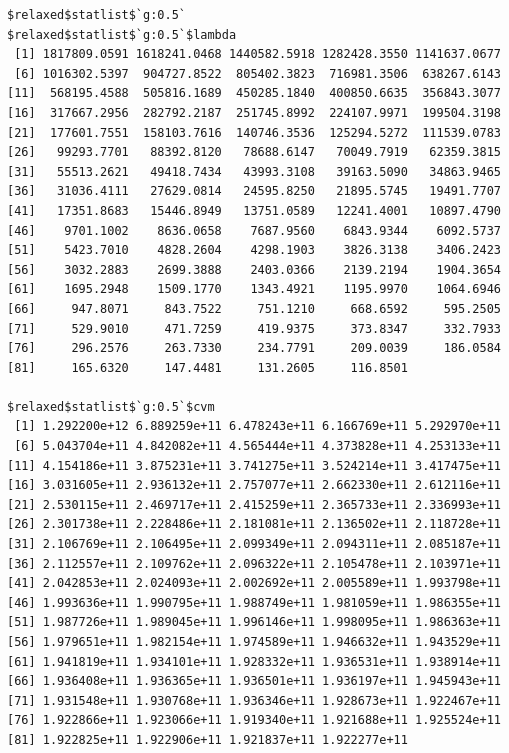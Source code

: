 \documentclass[
]{article}
\begin{document}
\begin{verbatim}
$relaxed$statlist$`g:0.5`
$relaxed$statlist$`g:0.5`$lambda
 [1] 1817809.0591 1618241.0468 1440582.5918 1282428.3550 1141637.0677
 [6] 1016302.5397  904727.8522  805402.3823  716981.3506  638267.6143
[11]  568195.4588  505816.1689  450285.1840  400850.6635  356843.3077
[16]  317667.2956  282792.2187  251745.8992  224107.9971  199504.3198
[21]  177601.7551  158103.7616  140746.3536  125294.5272  111539.0783
[26]   99293.7701   88392.8120   78688.6147   70049.7919   62359.3815
[31]   55513.2621   49418.7434   43993.3108   39163.5090   34863.9465
[36]   31036.4111   27629.0814   24595.8250   21895.5745   19491.7707
[41]   17351.8683   15446.8949   13751.0589   12241.4001   10897.4790
[46]    9701.1002    8636.0658    7687.9560    6843.9344    6092.5737
[51]    5423.7010    4828.2604    4298.1903    3826.3138    3406.2423
[56]    3032.2883    2699.3888    2403.0366    2139.2194    1904.3654
[61]    1695.2948    1509.1770    1343.4921    1195.9970    1064.6946
[66]     947.8071     843.7522     751.1210     668.6592     595.2505
[71]     529.9010     471.7259     419.9375     373.8347     332.7933
[76]     296.2576     263.7330     234.7791     209.0039     186.0584
[81]     165.6320     147.4481     131.2605     116.8501

$relaxed$statlist$`g:0.5`$cvm
 [1] 1.292200e+12 6.889259e+11 6.478243e+11 6.166769e+11 5.292970e+11
 [6] 5.043704e+11 4.842082e+11 4.565444e+11 4.373828e+11 4.253133e+11
[11] 4.154186e+11 3.875231e+11 3.741275e+11 3.524214e+11 3.417475e+11
[16] 3.031605e+11 2.936132e+11 2.757077e+11 2.662330e+11 2.612116e+11
[21] 2.530115e+11 2.469717e+11 2.415259e+11 2.365733e+11 2.336993e+11
[26] 2.301738e+11 2.228486e+11 2.181081e+11 2.136502e+11 2.118728e+11
[31] 2.106769e+11 2.106495e+11 2.099349e+11 2.094311e+11 2.085187e+11
[36] 2.112557e+11 2.109762e+11 2.096322e+11 2.105478e+11 2.103971e+11
[41] 2.042853e+11 2.024093e+11 2.002692e+11 2.005589e+11 1.993798e+11
[46] 1.993636e+11 1.990795e+11 1.988749e+11 1.981059e+11 1.986355e+11
[51] 1.987726e+11 1.989045e+11 1.996146e+11 1.998095e+11 1.986363e+11
[56] 1.979651e+11 1.982154e+11 1.974589e+11 1.946632e+11 1.943529e+11
[61] 1.941819e+11 1.934101e+11 1.928332e+11 1.936531e+11 1.938914e+11
[66] 1.936408e+11 1.936365e+11 1.936501e+11 1.936197e+11 1.945943e+11
[71] 1.931548e+11 1.930768e+11 1.936346e+11 1.928673e+11 1.922467e+11
[76] 1.922866e+11 1.923066e+11 1.919340e+11 1.921688e+11 1.925524e+11
[81] 1.922825e+11 1.922906e+11 1.921837e+11 1.922277e+11


\end{verbatim}
\end{document}
